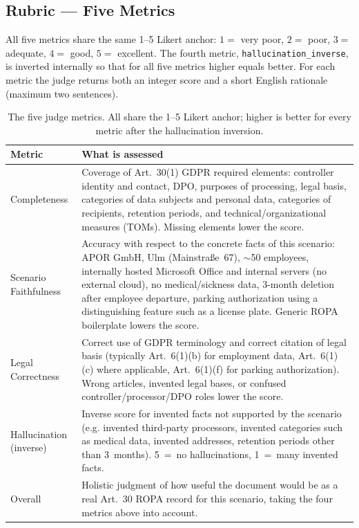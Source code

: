 \subsection{Rubric --- Five Metrics}
\label{app:judge-rubric}

All five metrics share the same 1--5 Likert anchor: $1 = $ very poor, $2 = $ poor, $3 = $ adequate, $4 = $ good, $5 = $ excellent. The fourth metric, \texttt{hallucination\_inverse}, is inverted internally so that for all five metrics higher equals better. For each metric the judge returns both an integer score and a short English rationale (maximum two sentences).

\begin{table}[H]
\centering
\small
\begin{tabularx}{\textwidth}{lX}
\toprule
\textbf{Metric} & \textbf{What is assessed} \\
\midrule
Completeness & Coverage of Art.~30(1) GDPR required elements: controller identity and contact, DPO, purposes of processing, legal basis, categories of data subjects and personal data, categories of recipients, retention periods, and technical/organizational measures (TOMs). Missing elements lower the score. \\
\addlinespace
Scenario Faithfulness & Accuracy with respect to the concrete facts of this scenario: APOR GmbH, Ulm (Mainstraße~67), $\sim$50 employees, internally hosted Microsoft Office and internal servers (no external cloud), no medical/sickness data, 3-month deletion after employee departure, parking authorization using a distinguishing feature such as a license plate. Generic ROPA boilerplate lowers the score. \\
\addlinespace
Legal Correctness & Correct use of GDPR terminology and correct citation of legal basis (typically Art.~6(1)(b) for employment data, Art.~6(1)(c) where applicable, Art.~6(1)(f) for parking authorization). Wrong articles, invented legal bases, or confused controller/processor/DPO roles lower the score. \\
\addlinespace
Hallucination (inverse) & Inverse score for invented facts not supported by the scenario (e.g. invented third-party processors, invented categories such as medical data, invented addresses, retention periods other than 3~months). 5~=~no hallucinations, 1~=~many invented facts. \\
\addlinespace
Overall & Holistic judgment of how useful the document would be as a real Art.~30 ROPA record for this scenario, taking the four metrics above into account. \\
\bottomrule
\end{tabularx}
\caption{The five judge metrics. All share the 1--5 Likert anchor; higher is better for every metric after the hallucination inversion.}
\label{tab:judge-rubric}
\end{table}

